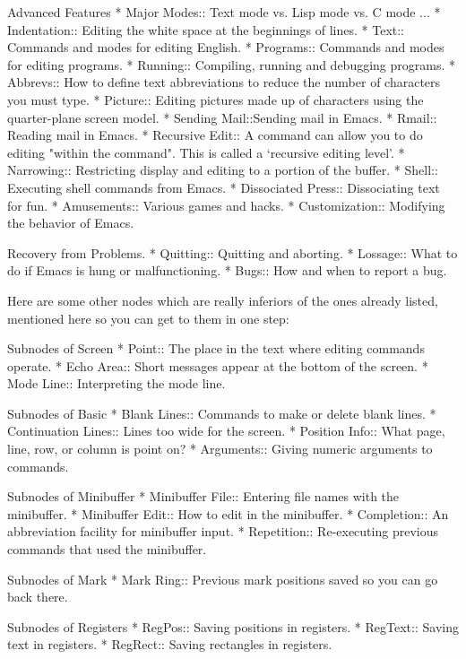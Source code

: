Advanced Features
* Major Modes:: Text mode vs. Lisp mode vs. C mode ...
* Indentation:: Editing the white space at the beginnings of lines.
* Text::        Commands and modes for editing English.
* Programs::    Commands and modes for editing programs.
* Running::     Compiling, running and debugging programs.
* Abbrevs::     How to define text abbreviations to reduce
                 the number of characters you must type.
* Picture::     Editing pictures made up of characters
                 using the quarter-plane screen model.
* Sending Mail::Sending mail in Emacs.
* Rmail::       Reading mail in Emacs.
* Recursive Edit::
                A command can allow you to do editing
                 "within the command".  This is called a
                 `recursive editing level'.
* Narrowing::   Restricting display and editing to a portion
                 of the buffer.
* Shell::       Executing shell commands from Emacs.
* Dissociated Press::  Dissociating text for fun.
* Amusements::         Various games and hacks.
* Customization::      Modifying the behavior of Emacs.

Recovery from Problems.
* Quitting::    Quitting and aborting.
* Lossage::     What to do if Emacs is hung or malfunctioning.
* Bugs::        How and when to report a bug.

Here are some other nodes which are really inferiors of the ones
already listed, mentioned here so you can get to them in one step:

Subnodes of Screen
* Point::	The place in the text where editing commands operate.
* Echo Area::   Short messages appear at the bottom of the screen.
* Mode Line::	Interpreting the mode line.

Subnodes of Basic
* Blank Lines:: Commands to make or delete blank lines.
* Continuation Lines:: Lines too wide for the screen.
* Position Info::      What page, line, row, or column is point on?
* Arguments::   Giving numeric arguments to commands.

Subnodes of Minibuffer
* Minibuffer File::    Entering file names with the minibuffer.
* Minibuffer Edit::    How to edit in the minibuffer.
* Completion::  An abbreviation facility for minibuffer input.
* Repetition::  Re-executing previous commands that used the minibuffer.

Subnodes of Mark
* Mark Ring::   Previous mark positions saved so you can go back there.

Subnodes of Registers
* RegPos::      Saving positions in registers.
* RegText::     Saving text in registers.
* RegRect::     Saving rectangles in registers.

